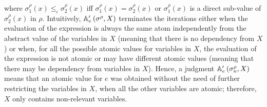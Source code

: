 \documentclass[prodmode,acmtocl]{acmsmall}
\def\state{\ensuremath{\sigma}\xspace}
\def\uco{\ensuremath{\rho}\xspace}
\def\avalue{\ensuremath{\mbox{{\sc{v}}}}\xspace}
\def\avaluee{\ensuremath{\mbox{{\sc{u}}}}\xspace}
\def\astate{{\sigma^\rho}\xspace}
\newcommand{\astatei}[1]{{\sigma^\rho_{#1}}\xspace}
\def\ok#1{\mbox{\raisebox{0ex}[1ex][1ex]{$#1$}}}
\newcommand{\COMMENT} [1]{}
\newcommand{\0}{\mbox{\bf 0}}
\def\ok#1{\mbox{\raisebox{0ex}[1ex][1ex]{$#1$}}}
\newcommand{\UNARYFUNCTION}[2]{#1\ifthenelse{\equal{#2}{}}{}{\left(#2\right)}}
\newcommand{\BINARYFUNCTION}[3]{#1\ifthenelse{\not\equal{#2}{}}{\left(#2\ifthenelse{\equal{#3}{}}{}{,#3}\right)}{}}
\newcommand{\CODE}[1]{\ensuremath{\mbox{\lstinline!#1!}\xspace}\xspace}
\def\xx{\CODE{x}}
\newcommand{\SEMANTICS}[1]{\left\llbracket #1 \right\rrbracket}
\def\exp{e}
\newcommand{\EVAL}[2]{\ok{\UNARYFUNCTION{\SEMANTICS{#1}}{#2}}}
\newcommand{\ABSEVAL}[2]{\ok{\UNARYFUNCTION{\SEMANTICS{#1}^\rho}{#2}}}
\newcommand{\ACC}[2]{\BINARYFUNCTION{\mathbb{A}'_e}{#1}{#2}}
\newcommand{\ACu}[2]{\UNARYFUNCTION{\mathbb{A}^{#1}_e}{#2}}
\newcommand{\SUBS}[2]{\left[#1|#2\right]}
\newcommand{\ISATOM}[2]{\textsc{Atom}_{#2}\left(#1\right)}
\begin{document}
where $\astatei{1}(x)\leq_\iota\astatei{2}(x)$ iff
$\astatei{1}(x)=\astatei{2}(x)$ or $\astatei{1}(x)$ is a direct
sub-value of $\astatei{2}(x)$ in $\uco$. Intuitively,
$\ACC{\astate}{X}$ terminates the iterations either when the
evaluation of the expression is always the same atom independently
from the abstract value of the variables in $X$ (meaning that there is
no dependency from $X$) or when, for all the possible atomic values
for variables in $X$, the evaluation of the expression is not atomic
or may have different atomic values (meaning that there may be
dependency from variables in $X$).  Hence, a judgment
$\ACC{\astatei{n}}{X}$ means that an atomic value for $\exp$ was
obtained without the need of further restricting the variables in $X$,
when all the other variables are atomic; therefore, $X$ only contains
non-relevant variables.
\COMMENT{
Let the set $\SUBS{\astate}{X}$ denote all the abstract states
$\astatei{1} \leq \astate$\footnote{Comparison on abstract states is
  variable-wise comparison on abstract values.} such that (1) $\forall
x \in X.\ \astatei{1}(x) = \astate(x)$; and (2)
$\ISATOM{\astatei{1}(y)}{\uco}$ holds for every $y\notin X$.  Namely,
$\SUBS{\astate}{X}$ is the set of abstract states which are equal to
$\astate$ on variables belonging to $X$, and yield atomic abstract
values on other variables.  To prove $e$ independent from $x$, we need
to prove $\ok{\ISATOM{\ABSEVAL{\exp}{\astatei{x}}}{\uco}}$ for any $\astatei{x}
\in \SUBS{\astatei{n}}{\{x\}}$, where $\astatei{n}$ is the abstract state
computed at $n$ as an invariant at that program point.  This amounts
to say that any variation in $x$ (up to the abstract value $\astatei{n}(x)$) does not lead to an observable
variation in $\exp$, whenever all the other variables are fully specified
as atoms.  Given an expression $\exp$ and an atom $\avaluee$, the
\emph{atomicity condition} $\ACu{\avaluee}{\astate}$ holds iff
$\ABSEVAL{\exp}{\astate}$ gives $\avaluee$, or there exists a covering
(Section \ref{sec:abstractSemantics}) $\{ \astatei{1},..,\astatei{k} \}$
of $\astate$ such that $\ACu{\avaluee}{\astatei{i}}$ holds for every
$i$.  Importantly, $\ACu{\avaluee}{\astate}$ implies that
$\uco(\{\EVAL{\exp}{\state'}|\state'\in\astate\})$ is an atom, and
the second disjunct helps if, due to some loss of information,
$\ABSEVAL{\exp}{\astate} > \avaluee$ although $\forall \astatei{1} <
\astate.\ \ABSEVAL{\exp}{\astatei{1}} = \avaluee$. 
According to Definition \ref{def:atomicAbstractDependencies}, in order
to prove the non-relevance of \xx it is enough to have $\exists
\avalue. \ACu{\avalue}{\astatei{x}}$ for every $\astatei{x}$ belonging to
$\SUBS{\astatei{n}}{\{\xx\}}$.  
Given a set of variables
$X$, a covering $\{\astatei{1}..\astatei{k}\}$ of $\astate$ is said to be
an $X$\emph{-covering} if (i) for every $x \in X$, and for every $i$,
it holds that $\astatei{i}(x) = \astate(x)$; and (ii) for every $y
\notin X$, and for every $i$, $\astatei{i}(y)$ is either $\astate(y)$ or
one of its \emph{direct} sub-values (i.e., some $\avalue{<}\astate(y)$
such that there is no $\avalue'$ with
$\avalue{<}\avalue'{<}\astate(y)$).

}
\end{document}
